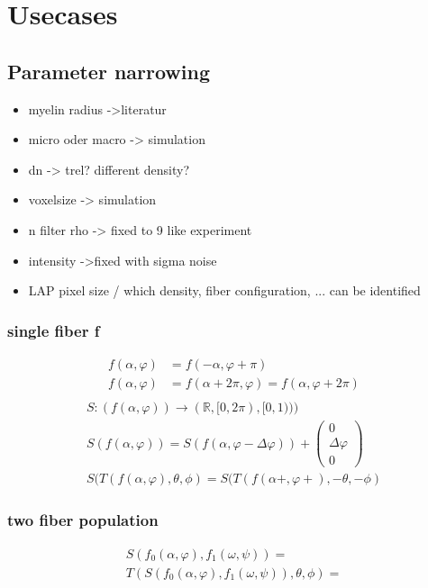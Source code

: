 \chapter{Usecases}
\label{sec:usecases}
%
\section{Parameter narrowing}
% 
\begin{itemize}
    \item myelin radius ->literatur
    \item micro oder macro -> simulation
    \item dn -> trel? different density?
    \item voxelsize -> simulation
    \item n filter rho -> fixed to 9 like experiment
    \item intensity ->fixed with sigma noise
    \item LAP pixel size / which density, fiber configuration, ... can be identified
\end{itemize}
% 
% 

\subsection{single fiber f}
\begin{align*}
    f(\alpha, \varphi) &= f(-\alpha, \varphi + \pi)\\
    f(\alpha, \varphi) &= f(\alpha+2\pi, \varphi)  = f(\alpha, \varphi+2\pi)\\
\end{align*}
\begin{align*}
    S:(f(\alpha, \varphi)) \rightarrow (\mathbb{R}, [0, 2 \pi), [0, 1)))\\
    S(f(\alpha, \varphi)) = S(f(\alpha, \varphi - \Delta\varphi)) + \begin{pmatrix}0\\ \Delta \varphi\\ 0\end{pmatrix}\\
    S(T(f(\alpha, \varphi), \theta, \phi) = S(T(f(\alpha+, \varphi+), -\theta, -\phi)
\end{align*}
% 
\subsection{two fiber population}
\begin{align*}
    S(f_0(\alpha, \varphi), f_1(\omega, \psi)) = \\
    T(S(f_0(\alpha, \varphi), f_1(\omega, \psi)), \theta, \phi) = 
\end{align*}

